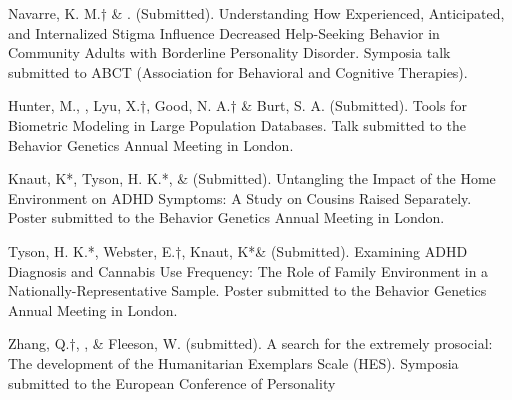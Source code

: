 \item Navarre, K. M.$\dagger$ \& \meb. (Submitted). Understanding How Experienced, Anticipated, and Internalized Stigma Influence Decreased Help-Seeking Behavior in Community Adults with Borderline Personality Disorder. Symposia talk submitted to ABCT (Association for Behavioral and Cognitive Therapies).

\item Hunter, M., \meb, Lyu, X.$\dagger$, Good, N. A.$\dagger$ \& Burt, S. A. (Submitted). Tools for Biometric Modeling in Large Population Databases. Talk submitted to the Behavior Genetics Annual Meeting in London.
\item Knaut, K*, Tyson, H. K.*, \& \meb (Submitted). Untangling the Impact of the Home Environment on ADHD Symptoms: A Study on Cousins Raised Separately. Poster submitted to the Behavior Genetics Annual Meeting in London.
\item Tyson, H. K.*, Webster, E.$\dagger$, Knaut, K*\& \meb (Submitted). Examining ADHD Diagnosis and Cannabis Use Frequency: The Role of Family Environment in a Nationally-Representative Sample. Poster submitted to the Behavior Genetics Annual Meeting in London.


\item Zhang, Q.$\dagger$, \meb, \&  Fleeson, W. (submitted). A search for the extremely prosocial: The development of the Humanitarian Exemplars Scale (HES). Symposia submitted to the European Conference of Personality %







%

%

%
